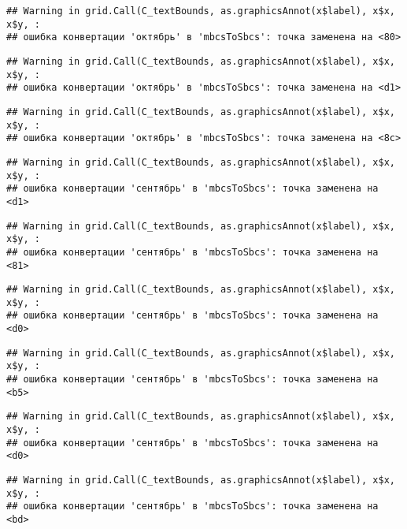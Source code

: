 \documentclass[
]{article}
\begin{document}
\begin{verbatim}
## Warning in grid.Call(C_textBounds, as.graphicsAnnot(x$label), x$x, x$y, :
## ошибка конвертации 'октябрь' в 'mbcsToSbcs': точка заменена на <80>
\end{verbatim}

\begin{verbatim}
## Warning in grid.Call(C_textBounds, as.graphicsAnnot(x$label), x$x, x$y, :
## ошибка конвертации 'октябрь' в 'mbcsToSbcs': точка заменена на <d1>
\end{verbatim}

\begin{verbatim}
## Warning in grid.Call(C_textBounds, as.graphicsAnnot(x$label), x$x, x$y, :
## ошибка конвертации 'октябрь' в 'mbcsToSbcs': точка заменена на <8c>
\end{verbatim}

\begin{verbatim}
## Warning in grid.Call(C_textBounds, as.graphicsAnnot(x$label), x$x, x$y, :
## ошибка конвертации 'сентябрь' в 'mbcsToSbcs': точка заменена на <d1>
\end{verbatim}

\begin{verbatim}
## Warning in grid.Call(C_textBounds, as.graphicsAnnot(x$label), x$x, x$y, :
## ошибка конвертации 'сентябрь' в 'mbcsToSbcs': точка заменена на <81>
\end{verbatim}

\begin{verbatim}
## Warning in grid.Call(C_textBounds, as.graphicsAnnot(x$label), x$x, x$y, :
## ошибка конвертации 'сентябрь' в 'mbcsToSbcs': точка заменена на <d0>
\end{verbatim}

\begin{verbatim}
## Warning in grid.Call(C_textBounds, as.graphicsAnnot(x$label), x$x, x$y, :
## ошибка конвертации 'сентябрь' в 'mbcsToSbcs': точка заменена на <b5>
\end{verbatim}

\begin{verbatim}
## Warning in grid.Call(C_textBounds, as.graphicsAnnot(x$label), x$x, x$y, :
## ошибка конвертации 'сентябрь' в 'mbcsToSbcs': точка заменена на <d0>
\end{verbatim}

\begin{verbatim}
## Warning in grid.Call(C_textBounds, as.graphicsAnnot(x$label), x$x, x$y, :
## ошибка конвертации 'сентябрь' в 'mbcsToSbcs': точка заменена на <bd>
\end{verbatim}
\end{document}
